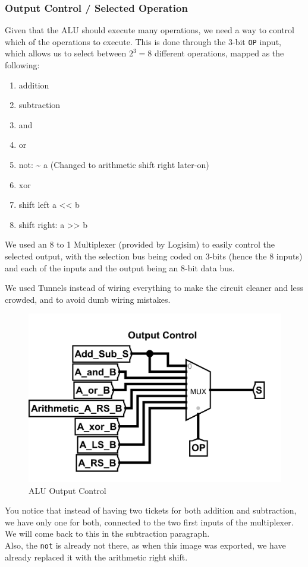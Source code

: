 \documentclass{article}
\begin{document}
\subsubsection{Output Control / Selected Operation}
Given that the ALU should execute many operations, we need a way to control which of the operations to execute. This is done through the 3-bit \verb|OP| input, which allows us to select between $2^3 = 8$ different operations, mapped as the following:
\begin{enumerate}[start=0, before=\small, after=\normalsize, itemsep=2pt, parsep=0pt]
    \item addition
    \item subtraction
    \item and
    \item or
    \item not: \textasciitilde{} a (Changed to arithmetic shift right later-on)
    \item xor
    \item shift left a << b
    \item shift right: a >> b
\end{enumerate}

We used an 8 to 1 Multiplexer (provided by Logisim) to easily control the selected output, with the selection bus being coded on 3-bits (hence the 8 inputs) and each of the inputs and the output being an 8-bit data bus.

We used Tunnels instead of wiring everything to make the circuit cleaner and less crowded, and to avoid dumb wiring mistakes.

\begin{figure}[H]
    \centering
    \includegraphics[width=.7\textwidth]{circuits/OutputControl.png}
    \caption{ALU Output Control}
\end{figure}

You notice that instead of having two tickets for both addition and subtraction, we have only one for both, connected to the two first inputs of the multiplexer. We will come back to this in the subtraction paragraph.\\
Also, the \verb|not| is already not there, as when this image was exported, we have already replaced it with the arithmetic right shift.
\end{document}
